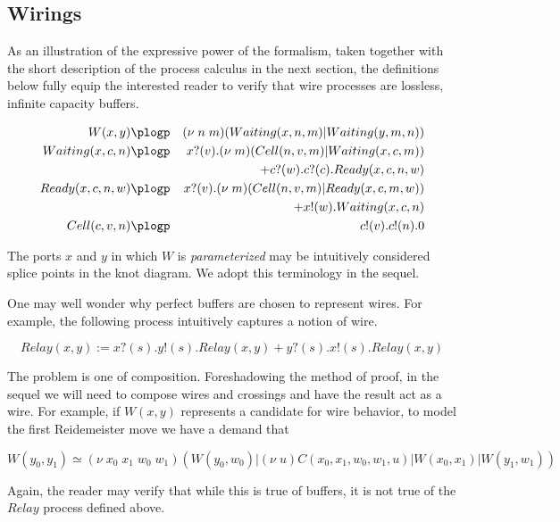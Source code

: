 \subsection{Wirings}\label{sub:wirings} %

As an illustration of the expressive power of the formalism, taken
together with the short description of the process calculus in the next
section, the definitions below fully equip the interested reader to
verify that wire processes are lossless, infinite capacity buffers. 


\begin{eqnarray*}
    W(x,y) & \plogp & (\nu \; n \; m)(Waiting(x,n,m) | Waiting(y,m,n)) \nonumber \\
Waiting(x,c,n) & \plogp   & x?(v).(\nu \; m)(Cell(n,v,m) | Waiting(x,c,m)) \nonumber \\
  & & + c?(w).c?(c).Ready(x,c,n,w) \nonumber \\
  Ready(x,c,n,w) & \plogp  & x?(v).(\nu \; m)(Cell(n,v,m) | Ready(x,c,m,w)) \nonumber \\
  & & + x!(w).Waiting(x,c,n) \nonumber \\
  Cell(c,v,n) & \plogp & c!(v).c!(n).0 \nonumber
\end{eqnarray*}

The ports $x$ and $y$ in which $W$ is \emph{parameterized} may be
intuitively considered splice points in the knot diagram. We adopt
this terminology in the sequel.

One may well wonder why perfect buffers are chosen to represent
wires. For example, the following process intuitively captures a notion of wire.

\begin{equation*}
  Relay(x,y) := x?(s).y!(s).Relay(x,y) + y?(s).x!(s).Relay(x,y)
\end{equation*}

The problem is one of composition. Foreshadowing the method of proof,
in the sequel we will need to compose wires and crossings and have the
result act as a wire. For example, if $W(x,y)$ represents a candidate
for wire behavior, to model the first Reidemeister move we have a demand that

\begin{equation*}
  W(y_{0},y_{1}) \simeq (\nu \; x_{0} \; x_{1} \; w_{0} \; w_{1} )(W(y_{0},w_{0}) |(\nu \; u)C(x_{0},x_{1},w_{0},w_{1},u) | W(x_{0},x_{1}) | W(y_{1},w_{1}))
\end{equation*}

Again, the reader may verify that while this is true of buffers, it is
not true of the $Relay$ process defined above.
